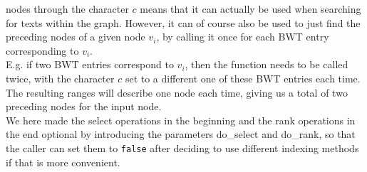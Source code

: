 \documentclass[a4paper,12pt,twoside,BCOR=10mm]{scrbook}
\begin{document}
nodes through the character $ c $ means that it can actually be used when searching 
for texts within the graph. 
However, it can of course also be used to just find the preceding nodes of a given node $ v_i $, 
by calling it once for each BWT entry corresponding to $ v_i $. \\
E.g. if two BWT entries correspond to $ v_i $, then the function needs to be called twice, 
with the character $ c $ set to a different one of these BWT entries each time. 
The resulting ranges will describe one node each time, 
giving us a total of two preceding nodes for the input node. \\
We here made the select operations in the beginning and the rank operations in 
the end optional by introducing the parameters do\_select and do\_rank, 
so that the caller can set them to \texttt{false} after 
deciding to use different indexing methods if that is more convenient.
\end{document}
